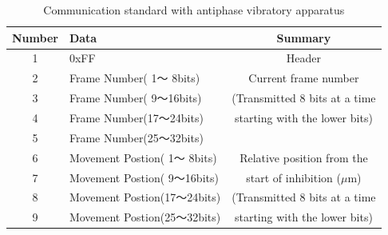 \begin{table}[tb]
  \centering
  \caption{Communication standard with antiphase vibratory apparatus}
  \label{table:interface}
  \begin{tabular}{|c|l|c|}
    \hline
    Number & Data & Summary                                         \\ \hline \hline
    1 &          0xFF            &   Header                         \\ \hline \hline
    2 & Frame Number( 1〜 8bits) &  Current frame number            \\ \cline{1-2}
    3 & Frame Number( 9〜16bits) &  (Transmitted 8 bits at a time   \\ \cline{1-2}
    4 & Frame Number(17〜24bits) &   starting with the lower bits)  \\ \cline{1-2}
    5 & Frame Number(25〜32bits) &                                  \\ \hline \hline
    6 & Movement Postion( 1〜 8bits)  &  Relative position from the    \\ \cline{1-2}
    7 & Movement Postion( 9〜16bits)  &  start of inhibition ($\mu$m)  \\ \cline{1-2}
    8 & Movement Postion(17〜24bits)  &  (Transmitted 8 bits at a time \\ \cline{1-2}
    9 & Movement Postion(25〜32bits)  &  starting with the lower bits) \\ \hline
  \end{tabular}
\end{table}






